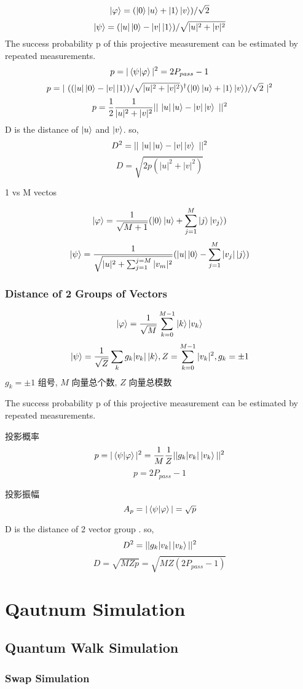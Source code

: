 \documentclass{article}
\begin{document}
\[  \ket{\varphi}=(\ket{0}\ket{u}+\ket{1}\ket{v})/\sqrt{2}
\]
\[  \ket{\psi}=(|u|\ket{0}-|v|\ket{1})/\sqrt{|u|^{2}+|v|^{2}}
\]
The success probability p of this projective measurement
can be estimated by repeated measurements.
\[  p=|\braket{\psi|\varphi}|^{2} = 2P_{pass}-1\]
\[
    p=|\   ((|u|\ket{0}-|v|\ket{1})/\sqrt{|u|^{2}+|v|^{2}})^{\dag}(\ket{0}\ket{u}+\ket{1}\ket{v})/\sqrt{2}\ |^{2}
\]
$$ p=\frac{1}{2}\frac{1}{|u|^{2}+|v|^{2}}||\ |u|\ket{u}-|v|\ket{v}\ ||^{2} $$
D is the distance of $\ket{u}$ and $\ket{v}$. so,\\
$$ D^{2}=||\ |u|\ket{u}-|v|\ket{v}\ ||^{2} $$
$$ D=\sqrt{2p(|u|^{2}+|v|^{2})} $$

1 vs M vectos


\[  \ket{\varphi}=\frac{1}{{\sqrt{M+1}}}(\ket{0}\ket{u}+\sum_{j=1}^{M}\ket{j}\ket{v_j})
\]
\[  \ket{\psi}=\frac{1}{\sqrt{|u|^{2}+\sum_{j=1}^{j=M}|v_m|^{2}}}(|u|\ket{0}-\sum_{j=1}^{M}|v_j|\ket{j})
\]

\subsubsection{ Distance of 2 Groups of Vectors}

\[  \ket{\varphi}= \frac{1}{ \sqrt{M} }  \sum_{k=0}^{M-1} { \ket{k}\ket{v_k} } 
\]
$$  \ket{\psi}=\frac{1}{ \sqrt{Z} }  \sum_k{ g_k  |v_k| \ket{k} } 
,  Z=  \sum_{k=0}^{M-1} {  |v_k|^2  }, g_k=\pm1 
$$
$g_k=\pm1$ 组号, $M$ 向量总个数, $Z$ 向量总模数

The success probability p of this projective measurement
can be estimated by repeated measurements.

投影概率
$$  p=|\braket{\psi|\varphi}|^{2}   = \frac{1}{ M }  \frac{1}{Z} ||g_k  |v_k| \ket{v_k}  ||^{2}  $$
$$ p = 2P_{pass}-1 $$

投影振幅
$$ A_p = |\braket{\psi|\varphi}| = \sqrt{p} $$

D is the distance of 2 vector group . so,\\
$$ D^{2}=||g_k  |v_k| \ket{v_k}  ||^{2} $$
$$ D=\sqrt{ M Z p }  = \sqrt{ M Z (2P_{pass}-1)}  $$

\section{Qautnum Simulation}
\subsection{Quantum Walk Simulation}
\subsubsection{Swap Simulation}
\end{document}
